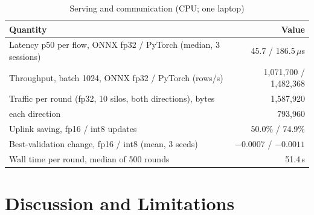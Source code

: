 \documentclass[conference]{IEEEtran}
\begin{document}
\begin{table}[t]
\centering
\caption{Serving and communication (CPU; one laptop)}
\label{tab:eff}
\footnotesize
\begin{tabularx}{\columnwidth}{@{}>{\raggedright\arraybackslash}Xr@{}}
\toprule
Quantity & Value\\
\midrule
Latency p50 per flow, ONNX fp32 / PyTorch (median, 3 sessions) & 45.7 / 186.5\,$\mu$s\\ %
Throughput, batch 1024, ONNX fp32 / PyTorch (rows/s) & 1,071,700 / 1,482,368\\ %
Traffic per round (fp32, 10 silos, both directions), bytes & 1,587,920\\ %
\quad each direction & 793,960\\ %
Uplink saving, fp16 / int8 updates & 50.0\% / 74.9\%\\ %
Best-validation change, fp16 / int8 (mean, 3 seeds) & $-0.0007$ / $-0.0011$\\ %
Wall time per round, median of 500 rounds & 51.4\,s\\ %
\bottomrule
\end{tabularx}
\end{table}

\section{Discussion and Limitations}
\end{document}
